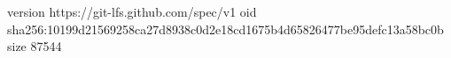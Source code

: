 version https://git-lfs.github.com/spec/v1
oid sha256:10199d21569258ca27d8938c0d2e18cd1675b4d65826477be95defc13a58bc0b
size 87544
